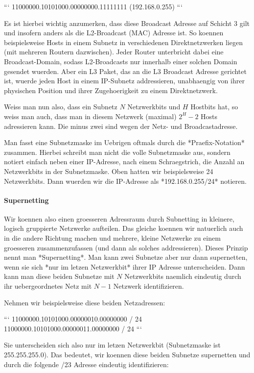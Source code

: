 ```
11000000.10101000.00000000.11111111 (192.168.0.255)
```

Es ist hierbei wichtig anzumerken, dass diese Broadcast Adresse auf Schicht 3
gilt und insofern anders als die L2-Broadcast (MAC) Adresse ist. So koennen
beispielsweise Hosts in einem Subnetz in verschiedenen Direktnetzwerken liegen
(mit mehreren Routern dazwischen). Jeder Router unterbricht dabei eine
Broadcast-Domain, sodass L2-Broadcasts nur innerhalb einer solchen Domain
gesendet wuerden. Aber ein L3 Paket, das an die L3 Broadcast Adresse gerichtet
ist, wuerde jeden Host in einem IP-Subnetz addressieren, unabhaengig von ihrer
physischen Position und ihrer Zugehoerigkeit zu einem Direktnetzwerk.

Weiss man nun also, dass ein Subnetz $N$ Netzwerkbits und $H$ Hostbits hat, so
weiss man auch, dass man in diesem Netzwerk (maximal) $2^H - 2$ Hosts
adressieren kann. Die minus zwei sind wegen der Netz- und Broadcastadresse.

Man fasst eine Subnetzmaske im Uebrigen oftmals durch die *Praefix-Notation*
zusammen. Hierbei schreibt man nicht die volle Subnetzmaske aus, sondern notiert
einfach neben einer IP-Adresse, nach einem Schraegstrich, die Anzahl an
Netzwerkbits in der Subnetzmaske. Oben hatten wir beispielsweise 24
Netzwerkbits. Dann wuerden wir die IP-Adresse als *192.168.0.255/24* notieren.

\paragraph{Supernetting} 

Wir koennen also einen groesseren Adressraum durch Subnetting in kleinere,
logisch gruppierte Netzwerke aufteilen. Das gleiche koennen wir natuerlich auch
in die andere Richtung machen und mehrere, kleine Netzwerke zu einem groesseren
zusammenzufassen (und dann als solches addressieren). Dieses Prinzip nennt man
*Supernetting*. Man kann zwei Subnetze aber nur dann supernetten, wenn sie sich
*nur im letzen Netzwerkbit* ihrer IP Adresse unterscheiden. Dann kann man diese
beiden Subnetze mit $N$ Netzwerkbits naemlich eindeutig durch ihr
uebergeordnetes Netz mit $N - 1$ Netzwerk identifizieren.

Nehmen wir beispielsweise diese beiden Netzadressen:

```
11000000.10101000.00000010.00000000 / 24
11000000.10101000.00000011.00000000 / 24
```

Sie unterscheiden sich also nur im letzen Netzwerkbit (Subnetzmaske ist
255.255.255.0). Das bedeutet, wir koennen diese beiden Subnetze supernetten und
durch die folgende /23 Adresse eindeutig identifizieren:

